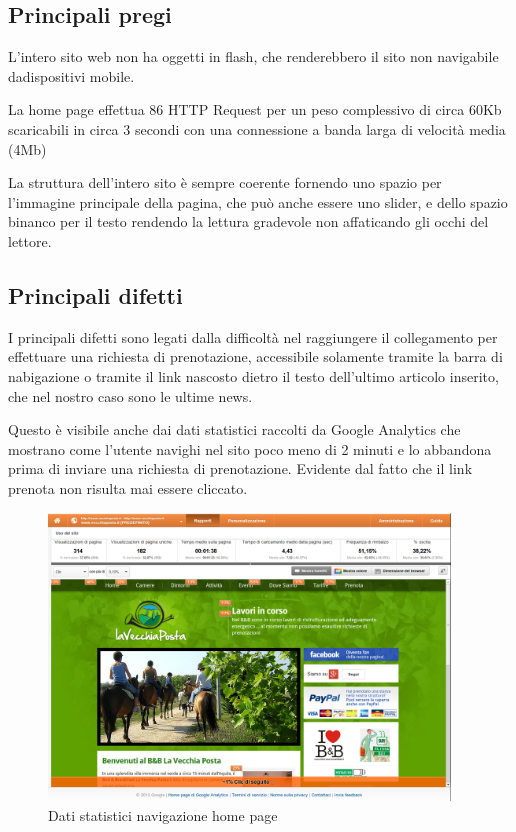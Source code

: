 \documentclass[a4paper,12pt,hidelinks]{report}
\begin{document}
\subsection{Principali pregi}
  L'intero sito web non ha oggetti in flash, che renderebbero il sito non navigabile dadispositivi mobile.
  \par La home page effettua 86 HTTP Request per un peso complessivo di circa 60Kb scaricabili in circa 3 secondi con una connessione a banda larga di velocità media (4Mb)
  \par La struttura dell'intero sito è sempre coerente fornendo uno spazio per l'immagine principale della pagina, che può anche essere uno slider, 
  e dello spazio binanco per il testo rendendo la lettura gradevole non affaticando gli occhi del lettore.

\subsection{Principali difetti}
  I principali difetti sono legati dalla difficoltà nel raggiungere il collegamento per effettuare una richiesta di prenotazione, accessibile 
  solamente tramite la barra di nabigazione o tramite il link nascosto dietro il testo dell'ultimo articolo inserito, che nel nostro caso sono le ultime news.
  \par Questo è visibile anche dai dati statistici raccolti da Google Analytics che mostrano come l'utente navighi nel sito 
  poco meno di 2 minuti e lo abbandona prima di inviare una richiesta di prenotazione. Evidente dal fatto che il link prenota non risulta mai essere cliccato.
  \begin{figure}[h!]%
    \includegraphics[width=0.95\textwidth,keepaspectratio=true]{img/googleAnalyticsDoc1}
    \centering
    \caption{Dati statistici navigazione home page}%
    \label{fig:googleHomePage}%
  \end{figure}
\end{document}
